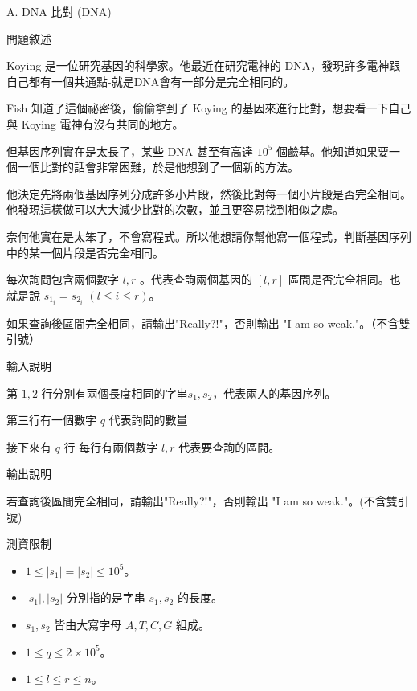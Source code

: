 \documentclass[12pt]{article}
\newcommand{\ProblemTitleFont}{\ProblemTitleMainFont\ProblemTitleCJKFont}
\newcommand{\ProblemTitle}[2]{\noindent\Large{\ProblemTitleFont #1 (#2)}\normalsize\par}
\newcommand{\ProblemSection}[1]{\vspace{0.6cm}\par\noindent\large{\ProblemTitleFont #1}\normalsize\par}
\newcommand{\ProblemStatement}{\ProblemSection{問題敘述}}
\newcommand{\ProblemInput}{\ProblemSection{輸入說明}}
\newcommand{\ProblemOutput}{\ProblemSection{輸出說明}}
\newcommand{\ProblemConstraints}{\ProblemSection{測資限制}}
\begin{document}
\renewcommand{\headrulewidth}{0pt}
\renewcommand{\baselinestretch}{1.3}
\setlength\parindent{24pt}
\setlength\parskip{12pt}
\cfoot{\thepage}

\ProblemTitle{A. DNA 比對}{DNA}

\ProblemStatement

Koying 是一位研究基因的科學家。他最近在研究電神的 DNA，發現許多電神跟自己都有一個共通點-就是DNA會有一部分是完全相同的。

Fish 知道了這個祕密後，偷偷拿到了 Koying 的基因來進行比對，想要看一下自己與 Koying 電神有沒有共同的地方。

但基因序列實在是太長了，某些 DNA 甚至有高達 $10^5$ 個鹼基。他知道如果要一個一個比對的話會非常困難，於是他想到了一個新的方法。

他決定先將兩個基因序列分成許多小片段，然後比對每一個小片段是否完全相同。他發現這樣做可以大大減少比對的次數，並且更容易找到相似之處。

奈何他實在是太笨了，不會寫程式。所以他想請你幫他寫一個程式，判斷基因序列中的某一個片段是否完全相同。

每次詢問包含兩個數字 $l, r$ 。代表查詢兩個基因的 $[l, r]$ 區間是否完全相同。也就是說 $s_{1_i} = s_{2_i}$ $(l \leq i \leq r)$。

如果查詢後區間完全相同，請輸出"Really?!"，否則輸出 "I am so weak."。（不含雙引號）

\ProblemInput

第 $1, 2$ 行分別有兩個長度相同的字串$s_1, s_2$，代表兩人的基因序列。

第三行有一個數字 $q$ 代表詢問的數量 

接下來有 $q$ 行 每行有兩個數字 $l, r$ 代表要查詢的區間。

\ProblemOutput

若查詢後區間完全相同，請輸出"Really?!"，否則輸出 "I am so weak."。(不含雙引號)

\clearpage

\ProblemConstraints

\begin{itemize}
    \item $1 \leq |s_1| = |s_2| \leq 10^5$。
    \item $|s_1|,|s_2|$ 分別指的是字串 $s_1,s_2$ 的長度。
    \item $s_1,s_2$ 皆由大寫字母 $A,T,C,G$ 組成。
    \item $1 \leq q \leq 2 \times 10^5$。
    \item $1 \leq l \leq r \leq n$。
\end{itemize}
\end{document}
